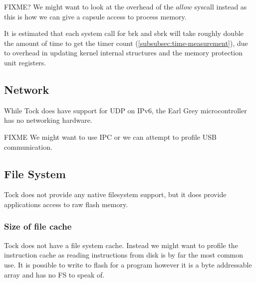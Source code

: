 \documentclass{article}
\begin{document}
FIXME? We might want to look at the overhead of the $allow$ syscall instead as this is how we can give a capsule access to process memory.

It is estimated that each system call for brk and sbrk will take roughly double the amount of time to get the timer count (\ref{subsubsec:time-measurement}), due to overhead in updating kernel internal structures and the memory protection unit registers.

\subsection{Network}

While Tock does have support for UDP on IPv6, the Earl Grey microcontroller has no networking hardware.


FIXME We might want to use IPC or we can attempt to profile USB communication.

\subsection{File System}


Tock does not provide any native filesystem support, but it does provide applications access to raw flash memory.

\subsubsection{Size of file cache}
Tock does not have a file system cache. Instead we might want to profile the instruction cache as reading instructions from disk is by far the most common use. It is possible to write to flash for a program however it is a byte addressable array and has no FS to speak of.
\end{document}
